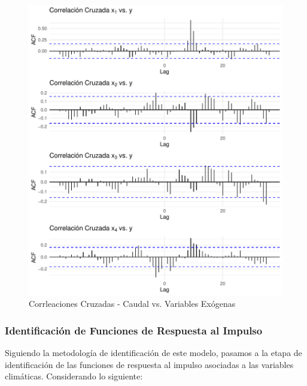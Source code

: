 \documentclass[12pt,oneside]{book}\usepackage[]{graphicx}\usepackage[]{color}
\makeatletter
\def\maxwidth{ %
  \ifdim\Gin@nat@width>\linewidth
    \linewidth
  \else
    \Gin@nat@width
  \fi
}
\newenvironment{knitrout}{}{} %
\theoremstyle{definition} %
\makeatother
\begin{document}
\begin{knitrout}
\color{fgcolor}\begin{figure}[H]

{\centering \includegraphics[width=\maxwidth]{figure/unnamed-chunk-34-1} 

}

\caption{\label{fig:cc_output} Corrleaciones Cruzadas - Caudal vs. Variables Exógenas}\label{fig:unnamed-chunk-34}
\end{figure}


\end{knitrout}




\newpage
\subsubsection{Identificación de Funciones de Respuesta al Impulso}

Siguiendo la metodología de identificación de este modelo, pasamos a la etapa de identificación de las funciones de respuesta al impulso asociadas a las variables climáticas. Considerando lo siguiente:
\end{document}
